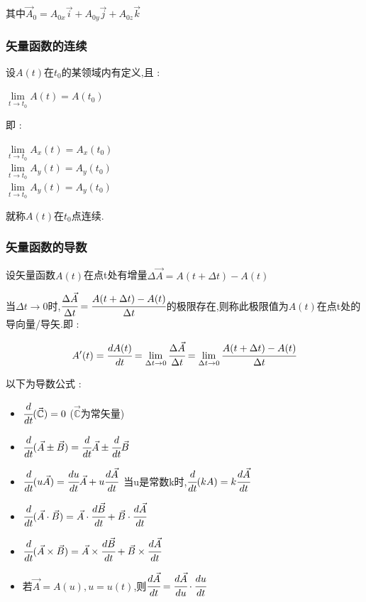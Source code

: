 \documentclass[UTF8,12pt]{ctexbook}
\newcommand{\limNormal}[1]{\lim\limits_{#1}}
\newcommand{\derivative}{^\prime}
\newcommand{\mathConstant}{\mathbb{C}}
\begin{document}
{{{{{      其中$\vec{A}_0 = A_{0x}\vec{i} + A_{0y}\vec{j} + A_{0z}\vec{k}$
    }%

    \subsubsection{矢量函数的连续}{
      设$A(t)$在$t_0$的某领域内有定义,且 :

      \begin{center}
        $\limNormal{t \to t_0}A(t) = A(t_0)$
      \end{center}

      即 :

      \begin{center}
        $\limNormal{t \to t_0}A_x(t) = A_x(t_0)$ \\
        $\limNormal{t \to t_0}A_y(t) = A_y(t_0)$ \\
        $\limNormal{t \to t_0}A_y(t) = A_y(t_0)$
      \end{center}

      就称$A(t)$在$t_0$点连续.
    }%

    \subsubsection{矢量函数的导数}{
      设矢量函数$A(t)$在点t处有增量$\Delta \vec{A} = A(t + \Delta t) - A(t)$

      当$\Delta t \to 0$时,$\cfrac{\Delta \vec{A}}{\Delta t} = \cfrac{A(t + \Delta t) - A(t)}{\Delta t}$的极限存在,则称此极限值为$A(t)$在点t处的导向量/导矢.即 :

      $$
        A\derivative(t) = \cfrac{dA(t)}{dt} = \limNormal{\Delta t \to 0}\cfrac{\Delta \vec{A}}{\Delta t} = \limNormal{\Delta t \to 0}\cfrac{A(t + \Delta t) - A(t)}{\Delta t}
      $$

      以下为导数公式 :

      \begin{itemize}
        \item $\cfrac{d}{dt}(\vec{\mathConstant}) = 0$ ($\vec{\mathConstant}$为常矢量)
        \item $\cfrac{d}{dt}(\vec{A} \pm \vec{B}) = \cfrac{d}{dt}\vec{A} \pm \cfrac{d}{dt}\vec{B}$
        \item $\cfrac{d}{dt}(u\vec{A}) = \cfrac{du}{dt}\vec{A} + u\cfrac{d\vec{A}}{dt}$\ 当u是常数k时,$\cfrac{d}{dt}(kA) = k\cfrac{d\vec{A}}{dt}$
        \item $\cfrac{d}{dt}(\vec{A}\cdot\vec{B}) = \vec{A}\cdot\cfrac{d\vec{B}}{dt} + \vec{B}\cdot\cfrac{d\vec{A}}{dt}$
        \item $\cfrac{d}{dt}(\vec{A}\times\vec{B}) = \vec{A}\times\cfrac{d\vec{B}}{dt} + \vec{B}\times\cfrac{d\vec{A}}{dt}$
        \item 若$\vec{A} = A(u),u = u(t)$,则$\cfrac{d\vec{A}}{dt} = \cfrac{d\vec{A}}{du}\cdot\cfrac{du}{dt}$
      \end{itemize}

}}}}}
\end{document}
